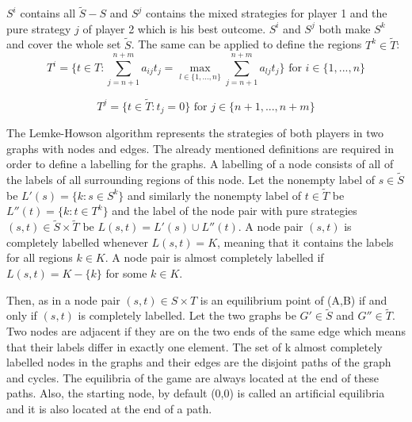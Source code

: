 $S^i$ contains all $\tilde{S}-S$ and $S^j$ contains the mixed strategies for player 1 and the pure strategy $j$ of player 2 which is his best outcome. $S^i$ and $S^j$ both make $S^k$ and cover the whole set $\tilde{S}$. The same can be applied to define the regions $T^k \in \tilde{T}$:
\begin{equation} 
T^i = \{ t \in T: \sum_{j=n+1}^{n+m} a_{ij} t_j = \max_{l \in \{1,...,n\}} \sum_{j=n+1}^{n+m} a_{lj} t_j \} \text{ for } i \in \{1,...,n\} 
\end{equation}

\begin{equation}
T^j = \{ t \in \tilde{T}: t_j = 0 \} \text{ for } j \in \{n+1,...,n+m\} 
\end{equation}


The Lemke-Howson algorithm represents the strategies of both players in two graphs with nodes and edges. The already mentioned definitions are required in order to define a labelling for the graphs. A labelling of a node consists of all of the labels of all surrounding regions of this node. Let the nonempty label of $s \in \tilde{S}$ be $L'(s) = \{ k: s \in S^k \}$ and similarly the nonempty label of $t \in \tilde{T}$ be $L''(t) = \{ k: t \in T^k \}$ and the label of the node pair with pure strategies $(s,t) \in \tilde{S} \times \tilde{T}$ be $L(s,t) = L'(s) \cup L''(t)$. A node pair $(s,t)$ is completely labelled whenever $L(s,t) = K$, meaning that it contains the labels for all regions $k \in K$. A node pair is almost completely labelled if $L(s,t) = K - \{k\}$ for some $k \in K$. 

Then, as in \citet{shapley1974note} a node pair $(s,t) \in S \times T$ is an equilibrium point of (A,B) if and only if $(s,t)$ is completely labelled. Let the two graphs be $G' \in \tilde{S}$ and $G'' \in \tilde{T}$. Two nodes are adjacent if they are on the two ends of the same edge which means that their labels differ in exactly one element. The set of k almost completely labelled nodes in the graphs and their edges are the disjoint paths of the graph and cycles. The equilibria of the game are always located at the end of these paths. Also, the starting node, by default (0,0) is called an artificial equilibria and it is also located at the end of a path.

